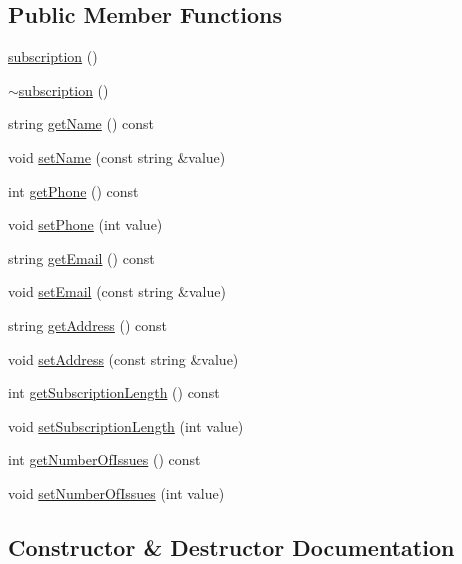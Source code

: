 \subsection*{Public Member Functions}
\begin{DoxyCompactItemize}
\item 
\hyperlink{classsubscription_a57a08062561881e94a59db81b504a5db}{subscription} ()
\item 
\hyperlink{classsubscription_ac62f79467cd92a397311043e4c709cf7}{$\sim$subscription} ()
\item 
string \hyperlink{classsubscription_a74713cf7f5e951e3b1bccaf50cda5646}{get\+Name} () const 
\item 
void \hyperlink{classsubscription_a0f8db666fb60557405d7cc3aed77aab9}{set\+Name} (const string \&value)
\item 
int \hyperlink{classsubscription_a2171d2c93ae430e4de4f6b42c330b963}{get\+Phone} () const 
\item 
void \hyperlink{classsubscription_a54f2451ffac6c73bb48737aa06b526ea}{set\+Phone} (int value)
\item 
string \hyperlink{classsubscription_abff99fbd4786c91d2ee0461536f1f35a}{get\+Email} () const 
\item 
void \hyperlink{classsubscription_a187c12aec11be3c2fc4fafcb37daa566}{set\+Email} (const string \&value)
\item 
string \hyperlink{classsubscription_a944b5dadf0818759f68d69e2eb1ea7dd}{get\+Address} () const 
\item 
void \hyperlink{classsubscription_a68251b27ee6c16b10e54bcb9e26f5d7e}{set\+Address} (const string \&value)
\item 
int \hyperlink{classsubscription_a6f1bf9f0efdcff9d07819896de903701}{get\+Subscription\+Length} () const 
\item 
void \hyperlink{classsubscription_a9ff5ac4f87bc2d6532838f0e5fba3854}{set\+Subscription\+Length} (int value)
\item 
int \hyperlink{classsubscription_a6749a06b79cd806030a322f1acc2961a}{get\+Number\+Of\+Issues} () const 
\item 
void \hyperlink{classsubscription_abd9e6884991c1918816916fabd5a5a79}{set\+Number\+Of\+Issues} (int value)
\end{DoxyCompactItemize}


\subsection{Constructor \& Destructor Documentation}
\hypertarget{classsubscription_a57a08062561881e94a59db81b504a5db}{}
